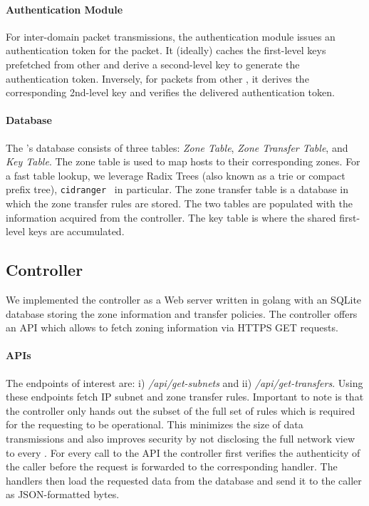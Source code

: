 \paragraph{Authentication Module}
For inter-domain packet transmissions, the authentication module issues an 
authentication token for the packet. It (ideally) caches the first-level keys prefetched
from other \tps and derive a second-level key to generate the authentication token. 
Inversely, for packets from other \tps, it derives the corresponding 2nd-level key
and verifies the delivered authentication token.

\paragraph{Database}
The \tp's database consists of three tables: \textit{Zone Table}, \textit{Zone Transfer 
Table}, and \textit{Key Table}. The zone table is used to map hosts to their corresponding 
zones. For a fast table lookup, we leverage Radix Trees (also known as a trie or compact prefix 
tree), \texttt{cidranger}~\cite{cidranger} in particular. The zone transfer table is a database 
in which the zone transfer rules are stored. The two tables are populated with the information 
acquired from the controller. The key table is where the shared first-level keys are 
accumulated. 

\subsection{Controller}
\label{ssec:controller}

We implemented the controller as a Web server written in golang with an SQLite database storing the 
zone information and transfer policies. The controller offers an API which allows
\tps to fetch zoning information via HTTPS GET requests.

\paragraph{APIs}
The endpoints of interest are: i) \textit{/api/get-subnets} and ii) \textit{/api/get-transfers}.
Using these endpoints \tps fetch IP subnet and zone transfer rules. Important to note is that 
the controller only hands out the subset of the full set of rules which is required for the 
requesting \tp to be operational. This minimizes the size of data transmissions and also 
improves security by not disclosing the full network view to every \tp. For every call to the 
API the controller first verifies the authenticity of the caller before the request is forwarded 
to the corresponding handler. The handlers then load the requested data from the database and 
send it to the caller as JSON-formatted bytes.

